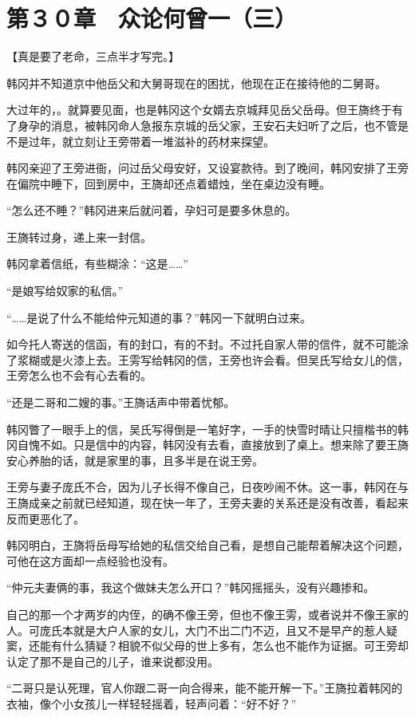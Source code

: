\section{第３０章　众论何曾一（三）}

【真是要了老命，三点半才写完。】

韩冈并不知道京中他岳父和大舅哥现在的困扰，他现在正在接待他的二舅哥。

大过年的，。就算要见面，也是韩冈这个女婿去京城拜见岳父岳母。但王旖终于有了身孕的消息，被韩冈命人急报东京城的岳父家，王安石夫妇听了之后，也不管是不是过年，就立刻让王旁带着一堆滋补的药材来探望。

韩冈亲迎了王旁进衙，问过岳父母安好，又设宴款待。到了晚间，韩冈安排了王旁在偏院中睡下，回到房中，王旖却还点着蜡烛，坐在桌边没有睡。

“怎么还不睡？”韩冈进来后就问着，孕妇可是要多休息的。

王旖转过身，递上来一封信。

韩冈拿着信纸，有些糊涂：“这是……”

“是娘写给奴家的私信。”

“……是说了什么不能给仲元知道的事？”韩冈一下就明白过来。

如今托人寄送的信函，有的封口，有的不封。不过托自家人带的信件，就不可能涂了浆糊或是火漆上去。王雱写给韩冈的信，王旁也许会看。但吴氏写给女儿的信，王旁怎么也不会有心去看的。

“还是二哥和二嫂的事。”王旖话声中带着忧郁。

韩冈瞥了一眼手上的信，吴氏写得倒是一笔好字，一手的快雪时晴让只擅楷书的韩冈自愧不如。只是信中的内容，韩冈没有去看，直接放到了桌上。想来除了要王旖安心养胎的话，就是家里的事，且多半是在说王旁。

王旁与妻子庞氏不合，因为儿子长得不像自己，日夜吵闹不休。这一事，韩冈在与王旖成亲之前就已经知道，现在快一年了，王旁夫妻的关系还是没有改善，看起来反而更恶化了。

韩冈明白，王旖将岳母写给她的私信交给自己看，是想自己能帮着解决这个问题，可他在这方面却一点经验也没有。

“仲元夫妻俩的事，我这个做妹夫怎么开口？”韩冈摇摇头，没有兴趣掺和。

自己的那一个才两岁的内侄，的确不像王旁，但也不像王雱，或者说并不像王家的人。可庞氏本就是大户人家的女儿，大门不出二门不迈，且又不是早产的惹人疑窦，还能有什么猜疑？相貌不似父母的世上多有，怎么也不能作为证据。可王旁却认定了那不是自己的儿子，谁来说都没用。

“二哥只是认死理，官人你跟二哥一向合得来，能不能开解一下。”王旖拉着韩冈的衣袖，像个小女孩儿一样轻轻摇着，轻声问着：“好不好？”

